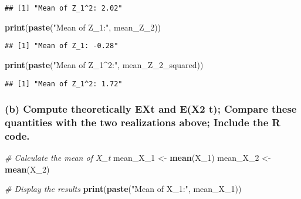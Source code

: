 \documentclass[
]{article}
\newenvironment{Shaded}{\begin{snugshade}}{\end{snugshade}}
\newcommand{\CommentTok}[1]{\textcolor[rgb]{0.56,0.35,0.01}{\textit{#1}}}
\newcommand{\FunctionTok}[1]{\textcolor[rgb]{0.13,0.29,0.53}{\textbf{#1}}}
\newcommand{\NormalTok}[1]{#1}
\newcommand{\OtherTok}[1]{\textcolor[rgb]{0.56,0.35,0.01}{#1}}
\newcommand{\StringTok}[1]{\textcolor[rgb]{0.31,0.60,0.02}{#1}}
\begin{document}
\begin{verbatim}
## [1] "Mean of Z_1^2: 2.02"
\end{verbatim}

\begin{Shaded}
\begin{Highlighting}[]
\FunctionTok{print}\NormalTok{(}\FunctionTok{paste}\NormalTok{(}\StringTok{"Mean of Z\_1:"}\NormalTok{, mean\_Z\_2))}
\end{Highlighting}
\end{Shaded}

\begin{verbatim}
## [1] "Mean of Z_1: -0.28"
\end{verbatim}

\begin{Shaded}
\begin{Highlighting}[]
\FunctionTok{print}\NormalTok{(}\FunctionTok{paste}\NormalTok{(}\StringTok{"Mean of Z\_1\^{}2:"}\NormalTok{, mean\_Z\_2\_squared))}
\end{Highlighting}
\end{Shaded}

\begin{verbatim}
## [1] "Mean of Z_1^2: 1.72"
\end{verbatim}

\hypertarget{b-compute-theoretically-ext-and-ex2-t-compare-these-quantities-with-the-two-realizations-above-include-the-r-code.}{%
\subsubsection{(b) Compute theoretically EXt and E(X2 t); Compare these
quantities with the two realizations above; Include the R
code.}\label{b-compute-theoretically-ext-and-ex2-t-compare-these-quantities-with-the-two-realizations-above-include-the-r-code.}}

\begin{Shaded}
\begin{Highlighting}[]
\CommentTok{\# Calculate the mean of X\_t}
\NormalTok{mean\_X\_1 }\OtherTok{\textless{}{-}} \FunctionTok{mean}\NormalTok{(X\_1)}
\NormalTok{mean\_X\_2 }\OtherTok{\textless{}{-}} \FunctionTok{mean}\NormalTok{(X\_2)}

\CommentTok{\# Display the results}
\FunctionTok{print}\NormalTok{(}\FunctionTok{paste}\NormalTok{(}\StringTok{"Mean of X\_1:"}\NormalTok{, mean\_X\_1))}
\end{Highlighting}
\end{Shaded}
\end{document}
